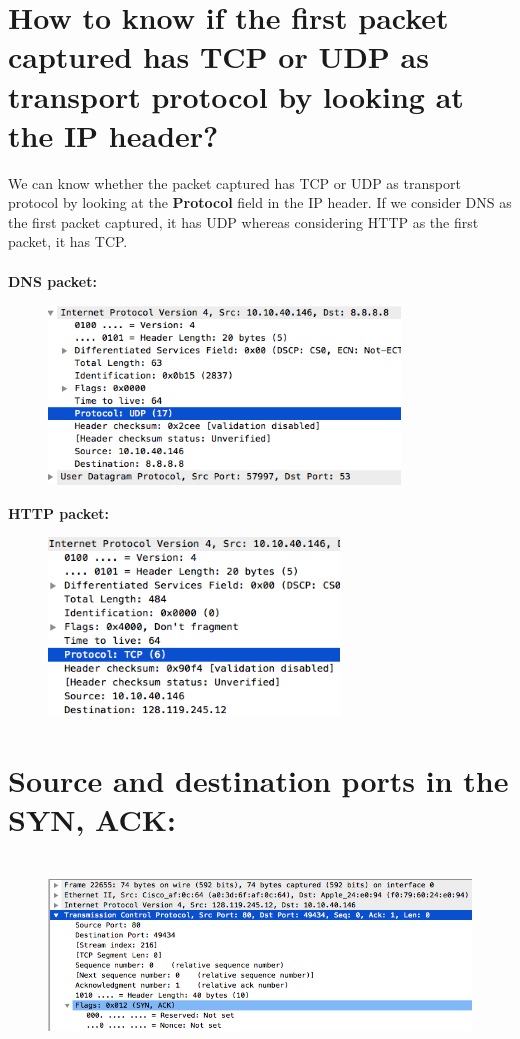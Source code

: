 \documentclass[]{report}
\begin{document}
\section{How to know if the first packet captured has TCP or UDP as transport protocol by looking at the IP header?}
We can know whether the packet captured has TCP or UDP as transport protocol by looking at the \textbf{Protocol} field in the IP header. If we consider DNS as the first packet captured, it has UDP whereas considering HTTP as the first packet, it has TCP. \\ \\
\textbf{DNS packet:}
\begin{figure}[H]
	\vspace{0pt}
	\includegraphics[height = 135pt, keepaspectratio]{Snapshots/q14_1.png}
\end{figure}
\textbf{HTTP packet:}
\begin{figure}[H]
	\vspace{0pt}
	\includegraphics[height = 135pt, keepaspectratio]{Snapshots/q14_2.png}
\end{figure}
\section{Source and destination ports in the SYN, ACK:}

\begin{figure}[H]
	\vspace{0pt}
	\includegraphics[height = 145pt, keepaspectratio]{Snapshots/q15.png}
\end{figure}
\end{document}
